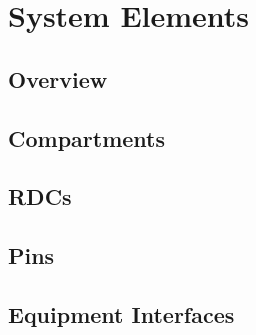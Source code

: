 \chapter{System Elements}
\label{cha:system-elements}

\section{Overview}

\section{Compartments}

\section{RDCs}

\section{Pins}

\section{Equipment Interfaces}



